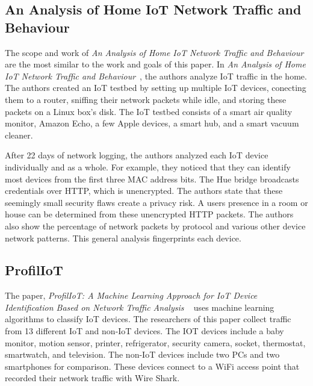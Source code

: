 \subsection{An Analysis of Home IoT Network Traffic and Behaviour}
\label{homeIoTPaper}
The scope and work of \textit{An Analysis of Home IoT Network Traffic and Behaviour}~\cite{home_iot} are the most similar to the work and goals of this paper. In \textit{An Analysis of Home IoT Network Traffic and Behaviour}~\cite{home_iot}, the authors analyze IoT traffic in the home. The authors created an IoT testbed by setting up multiple IoT devices, conecting them to a router, sniffing their network packets while idle, and storing these packets on a Linux box's disk. The IoT testbed consists of a smart air quality monitor, Amazon Echo, a few Apple devices, a smart hub, and a smart vacuum cleaner.

After 22 days of network logging, the authors analyzed each IoT device individually and as a whole. For example, they noticed that they can identify most devices from the first three MAC address bits. The Hue bridge broadcasts credentials over HTTP, which is unencrypted. The authors state that these seemingly small security flaws create a privacy risk. A users presence in a room or house can be determined from these unencrypted HTTP packets. The authors also show the percentage of network packets by protocol and various other device network patterns. This general analysis fingerprints each device.

\subsection{ProfilIoT}
\label{ProfilIoTPaper}
The paper, \textit{ProfilIoT: A Machine Learning Approach for IoT Device Identification Based on Network Traffic Analysis} ~\cite{Meidan:2017:PML:3019612.3019878} uses machine learning algorithms to classify IoT devices. The researchers of this paper collect traffic from 13 different IoT and non-IoT devices. The IOT devices include a baby monitor, motion sensor, printer, refrigerator, security camera, socket, thermostat, smartwatch, and television. The non-IoT devices include two PCs and two smartphones for comparison. These devices connect to a WiFi access point that recorded their network traffic with Wire Shark\cite{wireshark}.

